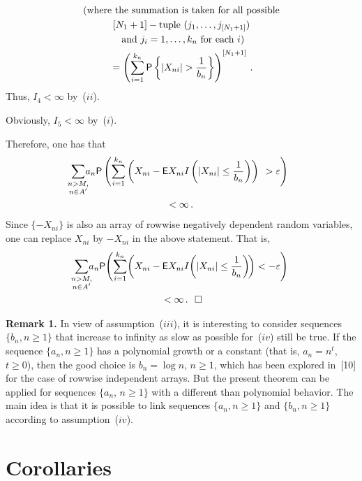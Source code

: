 \begin{multicols}{2}
\noindent
\begin{multline*}
\mbox{(where the summation is taken for all possible}\\
[N_1+1] -
\mbox{tuple } (j_1, \dots, j_{[N_1+1]})
\\
\mbox{ and}\ j_i=1,\dots,k_n \mbox{ for each } i)\\
{}=\left(\sum\limits_{i=1}^{k_n} {\sf P}\left\{|X_{ni}|>\fr{1}{b_n}\right\} \right)^{[N_1+1]}\,.
\end{multline*}
Thus, $I_4<\infty$ by~($ii$).

Obviously, $I_5<\infty$ by~($i$).

Therefore, one has that
\begin{multline*}
\hspace*{-6.64308pt}\sum\limits_{\substack{{n>M,}\\ {n \in A'}}}\!\!\!  a_n {\sf P}\left(\sum_{i=1}^{k_n} \left(X_{ni}- 
{\sf E}X_{ni}I\left(|X_{ni}|\le \fr{1}{b_n}\right)\right)\right.
\left.{}>\varepsilon\vphantom{\sum_{i=1}^{k_n}}\right)\\ <\infty\,. 
\end{multline*}
Since $\{-X_{ni}\}$ is also an array of rowwise  negatively dependent  random variables, one can replace $X_{ni}$
by $-X_{ni}$ in the above statement. That is,
\begin{multline*}
\hspace*{-3.68776pt}\sum\limits_{\substack{{n>M,}\\ {n \in A'}}} \!\!\! a_n {\sf P}\!
\left(\sum\limits_{i=1}^{k_n}\! \left(X_{ni}- {\sf E}X_{ni}I\!\left(\left|X_{ni}\right|
\le \fr{1}{b_n}\right)\!\right)
<-\varepsilon
\vphantom{\sum\limits_{i=1}^{k_n}}\right)\\
~<\infty\,.~~\square 
\end{multline*}


\noindent 
{\bf Remark 1.} In view of assumption~($iii$), it is interesting to consider sequences $\{b_n, n\ge 1\}$
that increase to infinity as slow as possible for~($iv$) still be true. If the sequence $\{a_n, n\ge 1\}$ has a
polynomial growth or a constant (that is, $a_n=n^t$, $t\ge 0$), then the good choice is $b_n=\log n$, $n\ge 1$,
which has been explored in~[10] for the case of rowwise independent arrays. 
But the present
theorem can be
applied for sequences $\{a_n$, $n\ge 1\}$ with a different than polynomial behavior. 
The main idea is that it is possible to
link sequences $\{a_n, n\ge 1\}$ and $\{b_n, n\ge 1\}$ according to assumption~($iv$).

\section{Corollaries}


\end{multicols}
